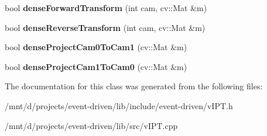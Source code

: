 \begin{DoxyCompactItemize}
\mbox{\label{classev_1_1vIPT_aeea8f19d5e518a6f5c4b183ac9b77f8d}} 
bool {\bfseries dense\+Forward\+Transform} (int cam, cv\+::\+Mat \&m)
\item 
\mbox{\label{classev_1_1vIPT_aa783cdb93de9493965ee07a66aade258}} 
bool {\bfseries dense\+Reverse\+Transform} (int cam, cv\+::\+Mat \&m)
\item 
\mbox{\label{classev_1_1vIPT_ace6abc6a89c59e3b330abac1d02703f1}} 
bool {\bfseries dense\+Project\+Cam0\+To\+Cam1} (cv\+::\+Mat \&m)
\item 
\mbox{\label{classev_1_1vIPT_ae17ef6d577f0aab01ac19bbe39046bf9}} 
bool {\bfseries dense\+Project\+Cam1\+To\+Cam0} (cv\+::\+Mat \&m)
\end{DoxyCompactItemize}


The documentation for this class was generated from the following files\+:\begin{DoxyCompactItemize}
\item 
/mnt/d/projects/event-\/driven/lib/include/event-\/driven/v\+I\+P\+T.\+h\item 
/mnt/d/projects/event-\/driven/lib/src/v\+I\+P\+T.\+cpp\end{DoxyCompactItemize}
